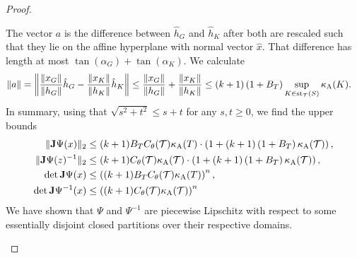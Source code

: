 \documentclass[10pt,a4paper]{article}
\begin{document}
\begin{proof}
\begin{itemize}
        The vector $a$ is the difference between $\hat h_{G}$ and $\hat h_{K}$ after both are rescaled such that they lie on the affine hyperplane with normal vector $\hat x$. That difference has length at most $\tan(\alpha_{G}) + \tan(\alpha_{K})$.
        We calculate 
        \begin{align*}
            \|a\|
            = 
            \left\|
            \frac{\|x_{G}\|}{\|h_{G}\|} \hat h_{{G}} 
            - 
            \frac{\|x_{K}\|}{\|h_{K}\|} \hat h_K
            \right\|
            &
            \leq 
            \frac{\|x_{G}\|}{\|h_{G}\|} 
            + 
            \frac{\|x_{K}\|}{\|h_{K}\|} 
            \leq 
            (k+1) 
            \left( 1 + B_{T} \right)
            \sup_{ K \in \patch_{\calT}(S) }
            \aspectratio(K) %
            .
        \end{align*}
        In summary, using that $\sqrt{s^2+t^2} \leq s + t$ for any $s,t \geq 0$, we find the upper bounds 
        \begin{align*}
            \matnorm{ \Jacobian\Psi(x) }
            &\leq  
            (k+1)B_{T}
            \diameterratio(\calT)
            \aspectratio(T) %
            \cdot 
            \left( 
                1 
                + 
                (k+1) 
                \left( 1 + B_{T} \right)
                \aspectratio(\calT) 
            \right)
            ,
            \\
            \matnorm{ \Jacobian\Psi(z)^{-1} }
            &\leq  
            (k+1)
            \diameterratio(\calT)
            \aspectratio(\calT) 
            \cdot 
            \left( 
                1 
                + 
                (k+1) 
                \left( 1 + B_{T} \right)
                \aspectratio(\calT) 
            \right)
            ,
            \\
            \det\Jacobian\Psi(x)
            &\leq 
            \left( 
            (k+1)B_{T}
            \diameterratio(\calT)
            \aspectratio(T) %
            \right)^{n},
            \\
            \det\Jacobian\Psi^{-1}(x)
            &\leq 
            \left( 
            (k+1)
            \diameterratio(\calT)
            \aspectratio(\calT) 
            \right)^{n}
        \end{align*}
        We have shown that $\Psi$ and $\Psi^{-1}$ are piecewise Lipschitz with respect to some essentially disjoint closed partitions over their respective domains.

\end{itemize}
\end{proof}
\end{document}
